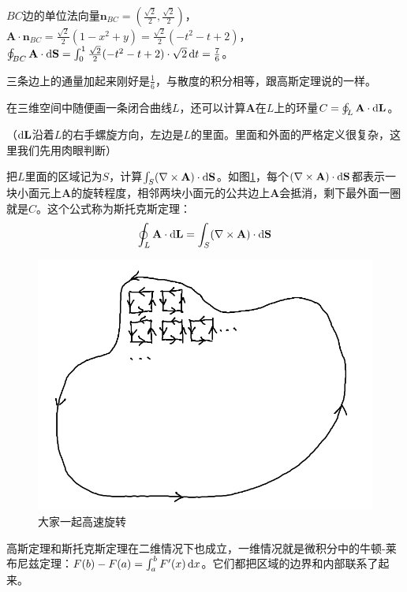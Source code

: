 $BC$边的单位法向量$\mathbf{n}_{BC}=(\frac{\sqrt{2}}{2},\frac{\sqrt{2}}{2})$，$\mathbf{A} \cdot \mathbf{n}_{BC}=\frac{\sqrt{2}}{2}(1-x^2+y)=\frac{\sqrt{2}}{2}(-t^2-t+2)$，$\oint_{BC} \mathbf{A} \cdot \mathop{}\!\mathrm{d} \mathbf{S}=\int_0^1 \frac{\sqrt{2}}{2}(-t^2-t+2) \cdot \sqrt{2} \mathop{}\!\mathrm{d} t=\frac{7}{6}$。

三条边上的通量加起来刚好是$\frac{1}{6}$，与散度的积分相等，跟高斯定理说的一样。

在三维空间中随便画一条闭合曲线$L$，还可以计算$\mathbf{A}$在$L$上的环量$C=\oint_L \mathbf{A} \cdot \mathop{}\!\mathrm{d} \mathbf{L}$。

（$\mathop{}\!\mathrm{d} \mathbf{L}$沿着$L$的右手螺旋方向，左边是$L$的里面。里面和外面的严格定义很复杂，这里我们先用肉眼判断）

把$L$里面的区域记为$S$，计算$\int_S (\nabla \times \mathbf{A}) \cdot \mathop{}\!\mathrm{d} \mathbf{S}$。如图\ref{fig-stokes-prove}，每个$(\nabla \times \mathbf{A}) \cdot \mathop{}\!\mathrm{d} \mathbf{S}$都表示一块小面元上$\mathbf{A}$的旋转程度，相邻两块小面元的公共边上$\mathbf{A}$会抵消，剩下最外面一圈就是$C$。这个公式称为斯托克斯定理：
\begin{equation*}
\oint_L \mathbf{A} \cdot \mathop{}\!\mathrm{d} \mathbf{L}=\int_S (\nabla \times \mathbf{A}) \cdot \mathop{}\!\mathrm{d} \mathbf{S}
\end{equation*}
\begin{figure}[htb]
\centering
\includegraphics[scale=0.5]{fig/stokes-prove.png}
\caption{大家一起高速旋转}
\label{fig-stokes-prove}
\end{figure}

高斯定理和斯托克斯定理在二维情况下也成立，一维情况就是微积分中的牛顿-莱布尼兹定理：$F(b)-F(a)=\int_a^b F'(x) \mathop{}\!\mathrm{d} x$。它们都把区域的边界和内部联系了起来。
